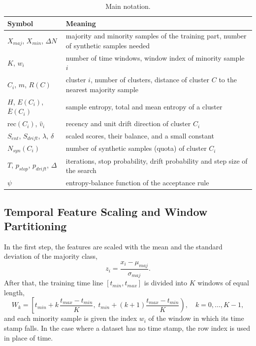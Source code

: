 \documentclass[preprint,10pt]{elsarticle}
\let\OldSubsection\subsection
\renewcommand{\subsection}{\OldSubsection}
\begin{document}
\begin{table}[!htbp]
\centering\small
\caption{Main notation.}\label{tab:notation}
\begin{tabular}{ll}
\toprule
Symbol & Meaning\\
\midrule
$X_{maj}$, $X_{min}$, $\Delta N$ & majority and minority samples of the training part, number of synthetic samples needed\\
$K$, $w_i$ & number of time windows, window index of minority sample $i$\\
$C_i$, $m$, $R(C)$ & cluster $i$, number of clusters, distance of cluster $C$ to the nearest majority sample\\
$H$, $E(C_i)$, $\bar E(C_i)$ & sample entropy, total and mean entropy of a cluster\\
$\mathrm{rec}(C_i)$, $\hat v_i$ & recency and unit drift direction of cluster $C_i$\\
$S_{ent}$, $S_{drift}$, $\lambda$, $\delta$ & scaled scores, their balance, and a small constant\\
$N_{syn}(C_i)$ & number of synthetic samples (quota) of cluster $C_i$\\
$T$, $p_{stop}$, $p_{drift}$, $\Delta$ & iterations, stop probability, drift probability and step size of the search\\
$\psi$ & entropy-balance function of the acceptance rule\\
\bottomrule
\end{tabular}
\end{table}

\subsection{Temporal Feature Scaling and Window Partitioning}
In the first step, the features are scaled with the mean and the standard deviation of the majority class,
\begin{equation}
z_i=\frac{x_i-\mu_{maj}}{\sigma_{maj}}.
\end{equation}
After that, the training time line $[t_{min},t_{max}]$ is divided into $K$ windows of equal length,
\begin{equation}
W_k=\left[t_{min}+k\,\frac{t_{max}-t_{min}}{K},\; t_{min}+(k+1)\frac{t_{max}-t_{min}}{K}\right),\quad k=0,\ldots,K-1,
\end{equation}
and each minority sample is given the index $w_i$ of the window in which its time stamp falls. In the case where a dataset has no time stamp, the row index is used in place of time.
\end{document}
